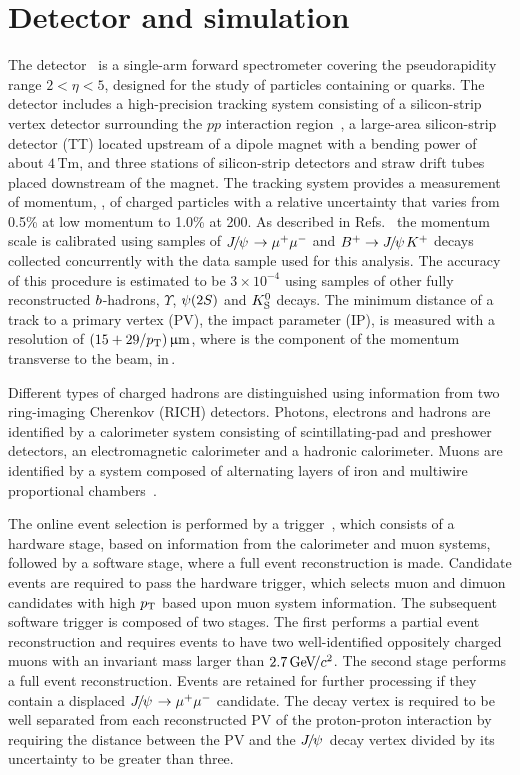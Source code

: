\section{Detector and simulation}
\label{sec:Detector}
%
The \lhcb detector~\cite{Alves:2008zz,LHCb-DP-2014-002} is a
single-arm forward spectrometer covering the \mbox{pseudorapidity}
range $2<\eta <5$, designed for the study of particles containing
\bquark or \cquark quarks. The detector includes a high-precision
tracking system consisting of a silicon-strip vertex detector surrounding the $pp$ interaction
region~\cite{LHCb-DP-2014-001}, a large-area silicon-strip
detector (TT) located upstream of a dipole magnet with a bending power of
about $4{\mathrm{\,Tm}}$, and three stations of silicon-strip
detectors and straw drift tubes~\cite{LHCb-DP-2013-003} placed
downstream of the magnet. The tracking system provides a measurement
of momentum, \ptot, of charged particles with a relative uncertainty
that varies from 0.5\% at low momentum to 1.0\% at 200\gevc. As
described in Refs.~\cite{LHCb-PAPER-2012-048,LHCb-PAPER-2013-011} the
momentum scale is calibrated using samples of ${{J\mskip -3mu/\mskip -2mu\psi\mskip 2mu}} \rightarrow {\ensuremath{\mu^+}}
{\ensuremath{\mu^-}}$ and ${{B}^+} \rightarrow {\ensuremath{{J\mskip -3mu/\mskip -2mu\psi\mskip 2mu}}} {\ensuremath{{K}^+}}$ decays collected concurrently
with the data sample used for this analysis. The accuracy of this
procedure is estimated to be $3 \times 10^{-4}$ using samples of other
fully reconstructed ${b}$-hadrons, $\Upsilon$, ${\psi{(2S)}}$ and ${{K}^0_{\mathrm{S}}}$ decays. The minimum distance of a track to a primary vertex (PV), the impact
parameter (IP), is measured with a resolution of $(15+29/p_{\mathrm{T}})\,\upmu\text{m}$,
where \pt is the component of the momentum transverse to the beam,
in\,\gevc. 

Different types of charged
hadrons are distinguished using information from two ring-imaging Cherenkov (RICH)
detectors. Photons, electrons and hadrons are
identified by a calorimeter system consisting of scintillating-pad and
preshower detectors, an electromagnetic calorimeter and a hadronic
calorimeter. Muons are  identified by a system composed of alternating
layers of iron and multiwire proportional chambers~\cite{LHCb-DP-2012-002}.  

The online event selection is performed by a
trigger~\cite{LHCb-DP-2012-004}, which consists of a hardware stage,
based on information from the calorimeter and muon 
systems, followed by a software stage, where  a full event
reconstruction is made. Candidate events are required to pass the
hardware trigger, which selects muon and dimuon candidates with high
$p_{\mathrm{T}}$ based upon muon system information. The subsequent software trigger is composed of two stages. The first performs a
partial event reconstruction and requires events to have two well-identified oppositely charged muons with an invariant mass larger
than $2.7 \text{\,Ge\kern -0.1em V\!/}c^2$. The second stage performs a full event
reconstruction.  Events are retained for further processing if they
contain a displaced ${{J\mskip -3mu/\mskip -2mu\psi\mskip 2mu}} \rightarrow \mu^+ \mu^-$ candidate. The
decay vertex is required to be well separated from each reconstructed
PV of the proton-proton interaction by requiring the distance between
the PV and the ${{J\mskip -3mu/\mskip -2mu\psi\mskip 2mu}}$ decay vertex  divided by its uncertainty to be greater than three.

